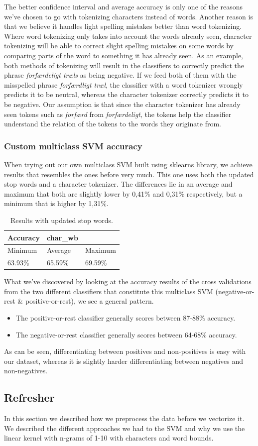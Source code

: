 The better confidence interval and average accuracy is only one of the reasons we've chosen to go with tokenizing characters instead of words. Another reason is that we believe it handles light spelling mistakes better than word tokenizing. Where word tokenizing only takes into account the words already seen, character tokenizing will be able to correct slight spelling mistakes on some words by comparing parts of the word to something it has already seen.
As an example, both methods of tokenizing will result in the classifiers to correctly predict the phrase \textit{forfærdeligt træls} as being negative. If we feed both of them with the misspelled phrase \textit{forfærdligt træl}, the classifier with a word tokenizer wrongly predicts it to be neutral, whereas the character tokenizer correctly predicts it to be negative. Our assumption is that since the character tokenizer has already seen tokens such as \textit{forfærd} from \textit{forfærdeligt}, the tokens help the classifier understand the relation of the tokens to the words they originate from.

\subsubsection{Custom multiclass SVM accuracy}
When trying out our own multiclass SVM built using sklearns library, we achieve results that resembles the ones before very much. This one uses both the updated stop words and a character tokenizer. The differences lie in an average and maximum that both are slightly lower by 0,41\% and 0,31\% respectively, but a minimum that is higher by 1,31\%. 
\begin{table}[H]
	\begin{tabular}{@{}lll@{}}
		\toprule
		Accuracy & char\_wb &         \\ \midrule
		Minimum  & Average  & Maximum \\
		63.93\%  & 65.59\%  & 69.59\% \\ \bottomrule
	\end{tabular}
	\centering
	\caption{Results with updated stop words.}
	\label{stopwords}
\end{table}
What we've discovered by looking at the accuracy results of the cross validations from the two different classifiers that constitute this multiclass SVM (negative-or-rest \& positive-or-rest), we see a general pattern.
\begin{itemize}
	\item The positive-or-rest classifier generally scores between 87-88\% accuracy.
	\item The negative-or-rest classifier generally scores between 64-68\% accuracy.
\end{itemize}
As can be seen, differentiating between positives and non-positives is easy with our dataset, whereas it is slightly harder differentiating between negatives and non-negatives.

\subsection{Refresher}
In this section we described how we preprocess the data before we vectorize it. We described the different approaches we had to the SVM and why we use the linear kernel with n-grams of 1-10 with characters and word bounds.

